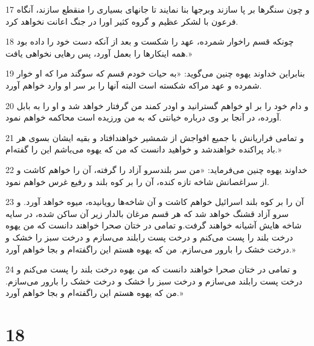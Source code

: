 \par 17 و چون سنگرها بر پا سازند وبرجها بنا نمایند تا جانهای بسیاری را منقطع سازند، آنگاه فرعون با لشکر عظیم و گروه کثیر اورا در جنگ اعانت نخواهد کرد.
\par 18 چونکه قسم راخوار شمرده، عهد را شکست و بعد از آنکه دست خود را داده بود همه اینکارها را بعمل آورد، پس رهایی نخواهی یافت.»
\par 19 بنابراین خداوند یهوه چنین می‌گوید: «به حیات خودم قسم که سوگند مرا که او خوار شمرده و عهد مراکه شکسته است البته آنها را بر سر او وارد خواهم آورد.
\par 20 و دام خود را بر او خواهم گسترانید و اودر کمند من گرفتار خواهد شد و او را به بابل آورده، در آنجا بر وی درباره خیانتی که به من ورزیده است محاکمه خواهم نمود.
\par 21 و تمامی فراریانش با جمیع افواجش از شمشیر خواهندافتاد و بقیه ایشان بسوی هر باد پراکنده خواهندشد و خواهید دانست که من که یهوه می‌باشم این را گفته‌ام.»
\par 22 خداوند یهوه چنین می‌فرماید: «من سر بلندسرو آزاد را گرفته، آن را خواهم کاشت و از سراغصانش شاخه تازه کنده، آن را بر کوه بلند و رفیع غرس خواهم نمود.
\par 23 آن را بر کوه بلند اسرائیل خواهم کاشت و آن شاخه‌ها رویانیده، میوه خواهد آورد. و سرو آزاد قشنگ خواهد شد که هر قسم مرغان بالدار زیر آن ساکن شده، در سایه شاخه هایش آشیانه خواهند گرفت.و تمامی در ختان صحرا خواهند دانست که من یهوه درخت بلند را پست می‌کنم و درخت پست رابلند می‌سازم و درخت سبز را خشک و درخت خشک را بارور می‌سازم. من که یهوه هستم این راگفته‌ام و بجا خواهم آورد.»
\par 24 و تمامی در ختان صحرا خواهند دانست که من یهوه درخت بلند را پست می‌کنم و درخت پست رابلند می‌سازم و درخت سبز را خشک و درخت خشک را بارور می‌سازم. من که یهوه هستم این راگفته‌ام و بجا خواهم آورد.»

\chapter{18}

